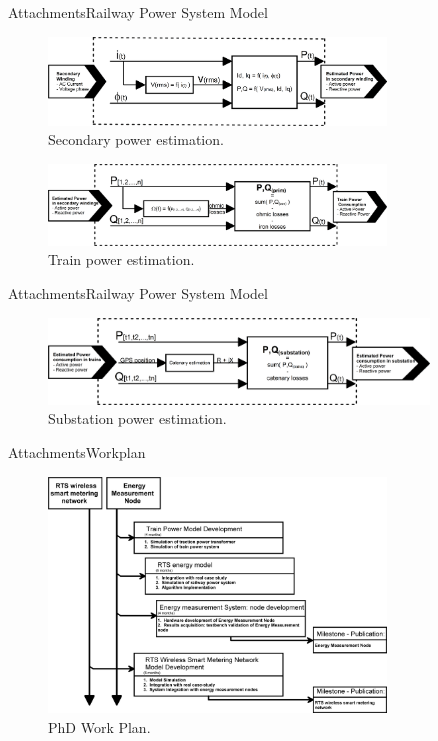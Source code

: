 \begin{frame}{Attachments}{Railway Power System Model}

\begin{figure}[ht!]
	\centering
	\includegraphics[width=0.8\textwidth,keepaspectratio]{figures/99.aux/voltage_estim}
	\caption{Secondary power estimation.}
\end{figure}

\begin{figure}[ht!]
	\centering
	\includegraphics[width=0.8\textwidth,keepaspectratio]{figures/99.aux/train_estim}
	\caption{Train power estimation.}
\end{figure}
\end{frame}

\begin{frame}{Attachments}{Railway Power System Model}
\begin{figure}[ht!]
	\centering
	\includegraphics[width=0.9\textwidth,keepaspectratio]{figures/99.aux/substation_estim}
	\caption{Substation power estimation.}
\end{figure}
\end{frame}


\begin{frame}{Attachments}{Workplan}
\begin{figure}[ht!]
	\centering
	\includegraphics[width=0.8\textwidth,keepaspectratio]{figures/40.Method/workplan1}
	\caption{PhD Work Plan.}
\end{figure}
\end{frame}


